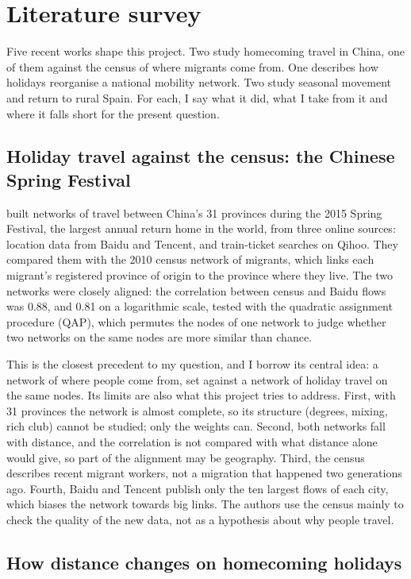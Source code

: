 \section{Literature survey}\label{sec:literature}

Five recent works shape this project. Two study homecoming travel in China, one of them against the census of where migrants come from. One describes how holidays reorganise a national mobility network. Two study seasonal movement and return to rural Spain. For each, I say what it did, what I take from it and where it falls short for the present question.

\subsection{Holiday travel against the census: the Chinese Spring Festival}

\citet{li2016spring} built networks of travel between China's 31 provinces during the 2015 Spring Festival, the largest annual return home in the world, from three online sources: location data from Baidu and Tencent, and train-ticket searches on Qihoo. They compared them with the 2010 census network of migrants, which links each migrant's registered province of origin to the province where they live. The two networks were closely aligned: the correlation between census and Baidu flows was 0.88, and 0.81 on a logarithmic scale, tested with the quadratic assignment procedure (QAP), which permutes the nodes of one network to judge whether two networks on the same nodes are more similar than chance.

This is the closest precedent to my question, and I borrow its central idea: a network of where people come from, set against a network of holiday travel on the same nodes. Its limits are also what this project tries to address. First, with 31 provinces the network is almost complete, so its structure (degrees, mixing, rich club) cannot be studied; only the weights can. Second, both networks fall with distance, and the correlation is not compared with what distance alone would give, so part of the alignment may be geography. Third, the census describes recent migrant workers, not a migration that happened two generations ago. Fourth, Baidu and Tencent publish only the ten largest flows of each city, which biases the network towards big links. The authors use the census mainly to check the quality of the new data, not as a hypothesis about why people travel.

\subsection{How distance changes on homecoming holidays}

